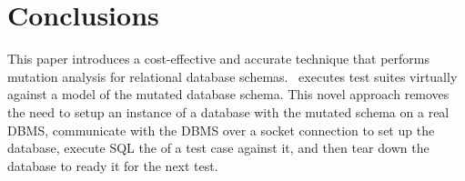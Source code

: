 
\section{Conclusions}
\label{sec:conclusions}


This paper introduces a cost-effective and accurate technique that performs mutation analysis for relational database schemas. \Vma~executes test suites virtually against a model of the mutated database schema. This novel approach removes the need to setup an instance of a database with the mutated schema on a real DBMS, communicate with the DBMS over a socket connection to set up the database, execute SQL the \INSERTs of a test case against it, and then tear down the database to ready it for the next test.


